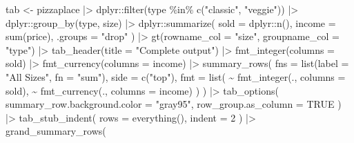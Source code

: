 \documentclass[
  letterpaper,
  DIV=11,
  numbers=noendperiod]{scrartcl}
\newenvironment{Shaded}{\begin{snugshade}}{\end{snugshade}}
\newcommand{\AttributeTok}[1]{\textcolor[rgb]{0.40,0.45,0.13}{#1}}
\newcommand{\ConstantTok}[1]{\textcolor[rgb]{0.56,0.35,0.01}{#1}}
\newcommand{\DecValTok}[1]{\textcolor[rgb]{0.68,0.00,0.00}{#1}}
\newcommand{\FunctionTok}[1]{\textcolor[rgb]{0.28,0.35,0.67}{#1}}
\newcommand{\NormalTok}[1]{\textcolor[rgb]{0.00,0.23,0.31}{#1}}
\newcommand{\OtherTok}[1]{\textcolor[rgb]{0.00,0.23,0.31}{#1}}
\newcommand{\SpecialCharTok}[1]{\textcolor[rgb]{0.37,0.37,0.37}{#1}}
\newcommand{\StringTok}[1]{\textcolor[rgb]{0.13,0.47,0.30}{#1}}
\begin{document}
\begin{Shaded}
\begin{Highlighting}[]
\NormalTok{tab }\OtherTok{\textless{}{-}}\NormalTok{ pizzaplace }\SpecialCharTok{|\textgreater{}}
\NormalTok{  dplyr}\SpecialCharTok{::}\FunctionTok{filter}\NormalTok{(type }\SpecialCharTok{\%in\%} \FunctionTok{c}\NormalTok{(}\StringTok{"classic"}\NormalTok{, }\StringTok{"veggie"}\NormalTok{)) }\SpecialCharTok{|\textgreater{}}
\NormalTok{  dplyr}\SpecialCharTok{::}\FunctionTok{group\_by}\NormalTok{(type, size) }\SpecialCharTok{|\textgreater{}}
\NormalTok{  dplyr}\SpecialCharTok{::}\FunctionTok{summarize}\NormalTok{(}
    \AttributeTok{sold =}\NormalTok{ dplyr}\SpecialCharTok{::}\FunctionTok{n}\NormalTok{(),}
    \AttributeTok{income =} \FunctionTok{sum}\NormalTok{(price),}
    \AttributeTok{.groups =} \StringTok{"drop"}
\NormalTok{  ) }\SpecialCharTok{|\textgreater{}}
  \FunctionTok{gt}\NormalTok{(}\AttributeTok{rowname\_col =} \StringTok{"size"}\NormalTok{, }\AttributeTok{groupname\_col =} \StringTok{"type"}\NormalTok{) }\SpecialCharTok{|\textgreater{}}
  \FunctionTok{tab\_header}\NormalTok{(}\AttributeTok{title =} \StringTok{"Complete output"}\NormalTok{) }\SpecialCharTok{|\textgreater{}}
  \FunctionTok{fmt\_integer}\NormalTok{(}\AttributeTok{columns =}\NormalTok{ sold) }\SpecialCharTok{|\textgreater{}}
  \FunctionTok{fmt\_currency}\NormalTok{(}\AttributeTok{columns =}\NormalTok{ income) }\SpecialCharTok{|\textgreater{}}
  \FunctionTok{summary\_rows}\NormalTok{(}
    \AttributeTok{fns =} \FunctionTok{list}\NormalTok{(}\AttributeTok{label =} \StringTok{"All Sizes"}\NormalTok{, }\AttributeTok{fn =} \StringTok{"sum"}\NormalTok{),}
    \AttributeTok{side =} \FunctionTok{c}\NormalTok{(}\StringTok{"top"}\NormalTok{),}
    \AttributeTok{fmt =} \FunctionTok{list}\NormalTok{(}
      \SpecialCharTok{\textasciitilde{}} \FunctionTok{fmt\_integer}\NormalTok{(., }\AttributeTok{columns =}\NormalTok{ sold),}
      \SpecialCharTok{\textasciitilde{}} \FunctionTok{fmt\_currency}\NormalTok{(., }\AttributeTok{columns =}\NormalTok{ income)}
\NormalTok{    )}
\NormalTok{  ) }\SpecialCharTok{|\textgreater{}}
  \FunctionTok{tab\_options}\NormalTok{(}
    \AttributeTok{summary\_row.background.color =} \StringTok{"gray95"}\NormalTok{,}
    \AttributeTok{row\_group.as\_column =} \ConstantTok{TRUE}
\NormalTok{  ) }\SpecialCharTok{|\textgreater{}}
  \FunctionTok{tab\_stub\_indent}\NormalTok{(}
    \AttributeTok{rows =} \FunctionTok{everything}\NormalTok{(),}
    \AttributeTok{indent =} \DecValTok{2}
\NormalTok{  ) }\SpecialCharTok{|\textgreater{}}
  \FunctionTok{grand\_summary\_rows}\NormalTok{(}

\end{Highlighting}
\end{Shaded}
\end{document}
